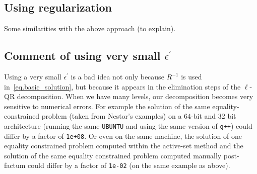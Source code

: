 \documentclass[12pt]{article}
\begin{document}
\subsection{Using regularization}

Some similarities with the above approach ({\color{red}to explain}).

\subsection{Comment of using very small $\epsilon^{'}$}

Using a very small $\epsilon^{'}$ is a bad idea not only because $R^{-1}$ is used
in~\eqref{eq.basic_solution}, but because it appears in the elimination steps of the $\ell$-QR
decomposition. When we have many levels, our decomposition becomes very sensitive to numerical
errors. For example the solution of the same equality-constrained problem (taken from Nestor's
examples) on a $64$-bit and $32$ bit architecture (running the same \verb|UBUNTU| and using the same
version of \verb|g++|) could differ by a factor of \verb|1e+08|. Or even on the same machine, the
solution of one equality constrained problem computed within the active-set method and the solution
of the same equality constrained problem computed manually post-factum could differ by a factor of
\verb|1e-02| (on the same example as above).
\end{document}
